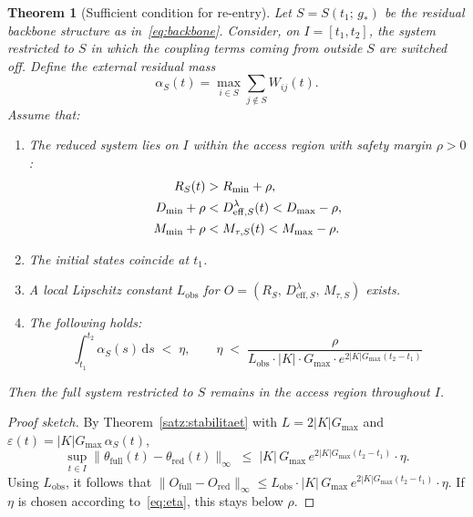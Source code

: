 \documentclass[11pt,a4paper]{article}
\theoremstyle{plain}
\newtheorem{theorem}{Theorem}[section]
\theoremstyle{definition}
\theoremstyle{remark}
\newcommand{\Rmin}{R_{\min}}
\newcommand{\Dmin}{D_{\min}}
\newcommand{\Dmax}{D_{\max}}
\newcommand{\Mmin}{M_{\min}}
\newcommand{\Mmax}{M_{\max}}
\newcommand{\Gmax}{G_{\max}}
\newcommand{\Lobs}{L_{\mathrm{obs}}}
\begin{document}
\begin{theorem}[Sufficient condition for re-entry]
\label{satz:reentry}
Let $S = S(t_1;\,g_*)$ be the residual backbone structure as in~\eqref{eq:backbone}. Consider, on $I = [t_1,t_2]$, the system restricted to $S$ in which the coupling terms coming from outside $S$ are switched off. Define the external residual mass
\begin{equation}
\alpha_S(t) = \max_{i \in S}\sum_{j \notin S} W_{ij}(t).
\end{equation}
Assume that:
\begin{enumerate}
\item The reduced system lies on $I$ within the access region with safety margin $\rho > 0$:
\begin{align}
R_S(t) &> \Rmin + \rho, \notag\\
\Dmin + \rho &< D_{\mathrm{eff},S}^{\lambda}(t) < \Dmax - \rho, \label{eq:marge}\\
\Mmin + \rho &< M_{\tau,S}(t) < \Mmax - \rho. \notag
\end{align}
\item The initial states coincide at $t_1$.
\item A local Lipschitz constant $\Lobs$ for $O = (R_S,\,D_{\mathrm{eff},S}^{\lambda},\,M_{\tau,S})$ exists.
\item The following holds:
\begin{equation}
\label{eq:eta}
\boxed{\;
\int_{t_1}^{t_2} \alpha_S(s)\,\mathrm{d}s \;<\; \eta, \qquad
\eta \;<\; \frac{\rho}{\Lobs \cdot |K| \cdot \Gmax \cdot e^{2|K|\Gmax(t_2 - t_1)}}
\;}
\end{equation}
\end{enumerate}
Then the full system restricted to $S$ remains in the access region throughout $I$.
\end{theorem}

\begin{proof}[Proof sketch]
By Theorem~\ref{satz:stabilitaet} with $L = 2|K|\Gmax$ and $\varepsilon(t) = |K|\Gmax\,\alpha_S(t)$,
\begin{equation}
\sup_{t \in I}\|\theta_{\mathrm{full}}(t) - \theta_{\mathrm{red}}(t)\|_{\infty}
\;\leq\; |K|\,\Gmax\,e^{2|K|\Gmax(t_2 - t_1)}\cdot\eta.
\end{equation}
Using $\Lobs$, it follows that $\|O_{\mathrm{full}} - O_{\mathrm{red}}\|_{\infty} \leq \Lobs \cdot |K|\,\Gmax\,e^{2|K|\Gmax(t_2-t_1)}\cdot\eta$. If $\eta$ is chosen according to~\eqref{eq:eta}, this stays below $\rho$.
\end{proof}
\end{document}
